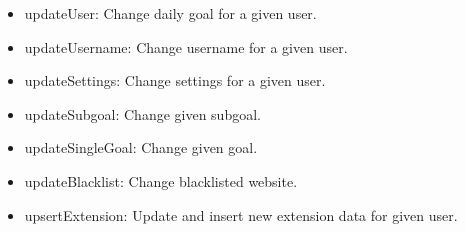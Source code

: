 \documentclass[letterpaper, 10 pt]{report}
\begin{document}
\begin{itemize}
 \item updateUser: Change daily goal for a given user.
 \item updateUsername: Change username for a given user.
 \item updateSettings: Change settings for a given user.
 \item updateSubgoal: Change given subgoal.
 \item updateSingleGoal: Change given goal.
 \item updateBlacklist: Change blacklisted website.
 \item upsertExtension: Update and insert new extension data for given user.
 
\end{itemize}

\newpage
%

\end{document}
